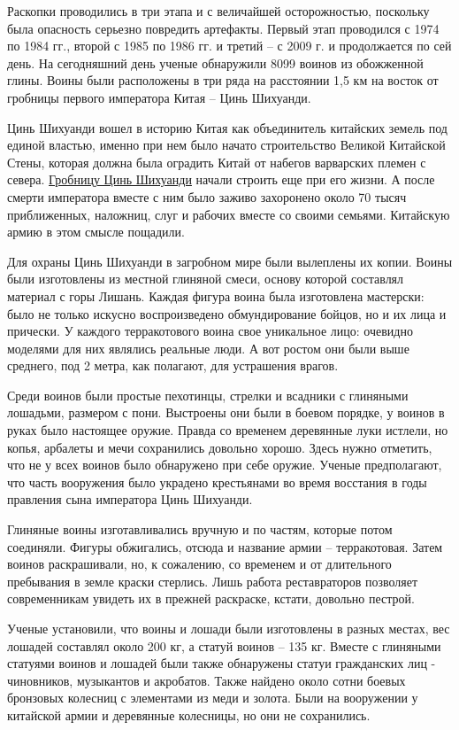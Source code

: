 Раскопки проводились в три этапа и с величайшей осторожностью, поскольку была опасность серьезно повредить артефакты. Первый этап проводился с 1974 по 1984 гг., второй с 1985 по 1986 гг. и третий – с 2009 г. и продолжается по сей день. На сегодняшний день ученые обнаружили 8099 воинов из обожженной глины. Воины были расположены в три ряда на расстоянии 1,5 км на восток от гробницы первого императора Китая – Цинь Шихуанди.

Цинь Шихуанди вошел в историю Китая как объединитель китайских земель под единой властью, именно при нем было начато строительство Великой Китайской Стены, которая должна была оградить Китай от набегов варварских племен с севера. \href{https://www.advantour.com/rus/china/xian/qin-shi-huang-tomb.htm}{Гробницу Цинь Шихуанди} начали строить еще при его жизни. А после смерти императора вместе с ним было заживо захоронено около 70 тысяч приближенных, наложниц, слуг и рабочих вместе со своими семьями. Китайскую армию в этом смысле пощадили.

Для охраны Цинь Шихуанди в загробном мире были вылеплены их копии. Воины были изготовлены из местной глиняной смеси, основу которой составлял материал с горы Лишань. Каждая фигура воина была изготовлена мастерски: было не только искусно воспроизведено обмундирование бойцов, но и их лица и прически. У каждого терракотового воина свое уникальное лицо: очевидно моделями для них являлись реальные люди. А вот ростом они были выше среднего, под 2 метра, как полагают, для устрашения врагов.

Среди воинов были простые пехотинцы, стрелки и всадники с глиняными лошадьми, размером с пони. Выстроены они были в боевом порядке, у воинов в руках было настоящее оружие. Правда со временем деревянные луки истлели, но копья, арбалеты и мечи сохранились довольно хорошо. Здесь нужно отметить, что не у всех воинов было обнаружено при себе оружие. Ученые предполагают, что часть вооружения было украдено крестьянами во время восстания в годы правления сына императора Цинь Шихуанди.

Глиняные воины изготавливались вручную и по частям, которые потом соединяли. Фигуры обжигались, отсюда и название армии – терракотовая. Затем воинов раскрашивали, но, к сожалению, со временем и от длительного пребывания в земле краски стерлись. Лишь работа реставраторов позволяет современникам увидеть их в прежней раскраске, кстати, довольно пестрой.

Ученые установили, что воины и лошади были изготовлены в разных местах, вес лошадей составлял около 200 кг, а статуй воинов – 135 кг. Вместе с глиняными статуями воинов и лошадей были также обнаружены статуи гражданских лиц - чиновников, музыкантов и акробатов. Также найдено около сотни боевых бронзовых колесниц с элементами из меди и золота. Были на вооружении у китайской армии и деревянные колесницы, но они не сохранились.

